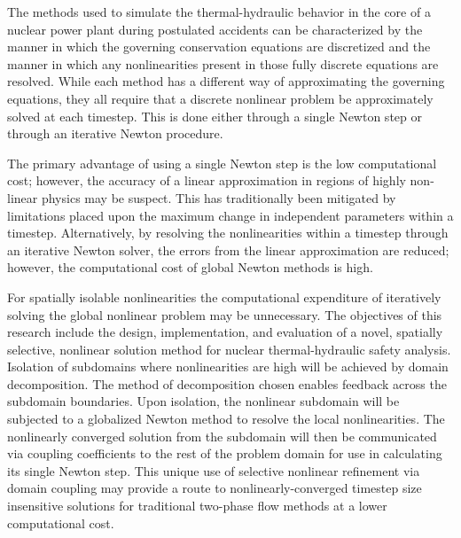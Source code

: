The methods used to simulate the thermal-hydraulic behavior in the core of a nuclear power plant during postulated accidents can be characterized by the manner in which the governing conservation equations are discretized and the manner in which any nonlinearities present in those fully discrete equations are resolved.
While each method has a different way of approximating the governing equations, they all require that a discrete nonlinear problem be approximately solved at each timestep.
This is done either through a single Newton step or through an iterative Newton procedure.

The primary advantage of using a single Newton step is the low computational cost; however, the accuracy of a linear approximation in regions of highly non-linear physics may be suspect.
This has traditionally been mitigated by limitations placed upon the maximum change in independent parameters within a timestep.
Alternatively, by resolving the nonlinearities within a timestep through an iterative Newton solver, the errors from the linear approximation are reduced; however, the computational cost of global Newton methods is high.

For spatially isolable nonlinearities the computational expenditure of iteratively solving the global nonlinear problem may be unnecessary.
The objectives of this research include the design, implementation, and evaluation of a novel, spatially selective, nonlinear solution method for nuclear thermal-hydraulic safety analysis.
Isolation of subdomains where nonlinearities are high will be achieved by domain decomposition.
The method of decomposition chosen enables feedback across the subdomain boundaries. 
Upon isolation, the nonlinear subdomain will be subjected to a globalized Newton method to resolve the local nonlinearities.
The nonlinearly converged solution from the subdomain will then be communicated via coupling coefficients to the rest of the problem domain for use in calculating its single Newton step.
This unique use of selective nonlinear refinement via domain coupling may provide a route to nonlinearly-converged timestep size insensitive solutions for traditional two-phase flow methods at a lower computational cost.